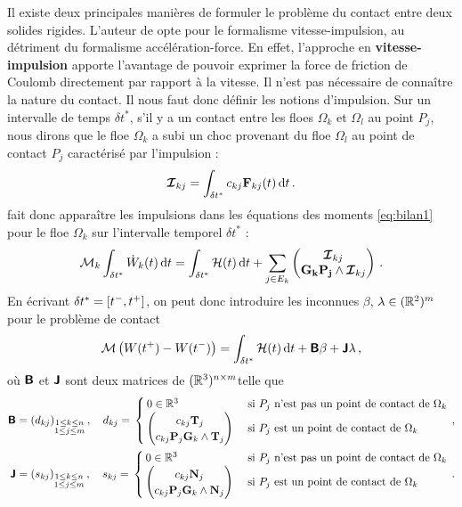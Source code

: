 Il existe deux principales manières de formuler le problème du contact entre deux solides rigides. L'auteur de \parencite{rabatel2015thesis} opte pour le formalisme vitesse-impulsion, au détriment du formalisme accélération-force. En effet, l’approche en \textbf{vitesse-impulsion} apporte l’avantage de pouvoir exprimer la force de friction de Coulomb directement par rapport à la vitesse. Il n’est pas nécessaire de connaître la nature du contact. Il nous faut donc définir les notions d'impulsion. Sur un intervalle de temps $\delta t^*$, s’il y a un contact entre les floes $\Omega_k$ et $\Omega_l$ au point $P_j$, nous dirons que le floe $\Omega_k$ a subi un choc provenant du floe $\Omega_l$ au point de contact $P_j$ caractérisé par l’impulsion :
$$
\bvec{\mathcal{I}}_{kj} = \int_{\delta t^*} c_{kj} \bvec{F}_{kj}(t) \diff t \,.
$$ 
\citeauthor{rabatel2015thesis} fait donc apparaître les impulsions dans les équations des moments \cref{eq:bilan1} pour le floe $\Omega_k$ sur l’intervalle temporel $\delta t^*$ :
$$
\mathcal{M}_k \int_{\dtstar} \dot{W}_k(t) \diff t = \int_{\dtstar} \mathcal{H}(t) \diff t + \sum_{j \in E_k} \begin{pmatrix}
    \bvec{\mathcal{I}}_{kj} \\ \bvec{G_kP_j} \wedge \bvec{\mathcal{I}}_{kj} 
\end{pmatrix} \,.
$$
En écrivant $\delta t^* = [t^{-}, t^{+}]$, on peut donc introduire les inconnues $\beta$, $\lambda \in (\mathbb{R}^2)^m$ pour le problème de contact  
\begin{align}
    \mathcal{M} \left( W(t^{+}) - W(t^{-}) \right) = \int_{\dtstar} \mathcal{H}(t) \diff t + \bmat{B}\beta + \bmat{J}\lambda \,,
\end{align}
où $\bm{\mathsf{B}}$ et $\bm{\mathsf{J}}$ sont deux matrices de $(\mathbb{R}^3)^{n \times m}$telle que
\begin{align*}
    \bm{\mathsf{B}} = (d_{kj})_{\substack{1 \leq k \leq n \\ 1 \leq j \leq m}} \,, \quad d_{kj} = \,
    \begin{cases}
        0 \in \mathbb{R}^3 &\text{ si } P_j \text{ n'est pas un point de contact de } \Omega_k \\
        \begin{pmatrix}
            c_{kj} \bm{\mathrm{T}}_{j} \\ c_{kj} \bm{\mathrm{P}}_j\bm{\mathrm{G}}_k \wedge \bm{\mathrm{T}}_j 
        \end{pmatrix} &\text{ si } P_j \text{ est un point de contact de } \Omega_k
    \end{cases} \,, \\
    \bm{\mathsf{J}} = (s_{kj})_{\substack{1 \leq k \leq n \\ 1 \leq j \leq m}} \,, \quad s_{kj} = \,
    \begin{cases}
        0 \in \mathbb{R}^3 &\text{ si } P_j \text{ n'est pas un point de contact de } \Omega_k \\
        \begin{pmatrix}
            c_{kj} \bm{\mathrm{N}}_{j} \\ c_{kj} \bm{\mathrm{P}}_j\bm{\mathrm{G}}_k \wedge \bm{\mathrm{N}}_j 
        \end{pmatrix} &\text{ si } P_j \text{ est un point de contact de } \Omega_k
    \end{cases} \,.
\end{align*}
